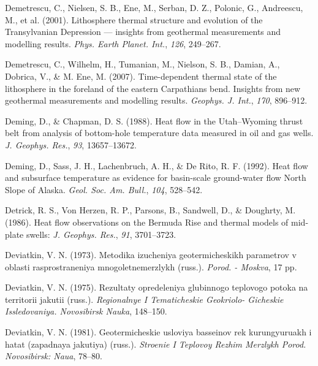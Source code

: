 \documentclass[draft,linenumbers]{agujournal2018}
\begin{document}
\leavevmode{}%
Demetrescu, C., Nielsen, S. B., Ene, M., Serban, D. Z., Polonic, G.,
Andreescu, M., et al. (2001). Lithosphere thermal structure and
evolution of the {Transylvanian Depression} --- insights from geothermal
measurements and modelling results. \emph{Phys. Earth Planet. Int.},
\emph{126}, 249--267.

\leavevmode{}%
Demetrescu, C., Wilhelm, H., Tumanian, M., Nielson, S. B., Damian, A.,
Dobrica, V., \& M. Ene, M. (2007). Time-dependent thermal state of the
lithosphere in the foreland of the eastern {Carpathians} bend. Insights
from new geothermal measurements and modelling results. \emph{Geophys.
J. Int.}, \emph{170}, 896--912.

\leavevmode{}%
Deming, D., \& Chapman, D. S. (1988). Heat flow in the {Utah--Wyoming}
thrust belt from analysis of bottom-hole temperature data measured in
oil and gas wells. \emph{J. Geophys. Res.}, \emph{93}, 13657--13672.

\leavevmode{}%
Deming, D., Sass, J. H., Lachenbruch, A. H., \& De Rito, R. F. (1992).
Heat flow and subsurface temperature as evidence for basin-scale
ground-water flow {North Slope of Alaska}. \emph{Geol. Soc. Am. Bull.},
\emph{104}, 528--542.

\leavevmode{}%
Detrick, R. S., Von Herzen, R. P., Parsons, B., Sandwell, D., \&
Doughrty, M. (1986). Heat flow observations on the {Bermuda Rise} and
thermal models of mid-plate swells: \emph{J. Geophys. Res.}, \emph{91},
3701--3723.

\leavevmode{}%
Deviatkin, V. N. (1973). Metodika izucheniya geotermicheskikh parametrov
v oblasti rasprostraneniya mnogoletnemerzlykh (russ.). \emph{Porod. -
Moskva}, 17 pp.

\leavevmode{}%
Deviatkin, V. N. (1975). Rezultaty opredeleniya glubinnogo teplovogo
potoka na territorii jakutii (russ.). \emph{Regionalnye I Tematicheskie
Geokriolo- Gicheskie Issledovaniya. Novosibirsk Nauka}, 148--150.

\leavevmode{}%
Deviatkin, V. N. (1981). Geotermicheskie usloviya basseinov rek
kurungyuruakh i hatat (zapadnaya jakutiya) (russ.). \emph{Stroenie I
Teplovoy Rezhim Merzlykh Porod. Novosibirsk: Naua}, 78--80.
\end{document}

